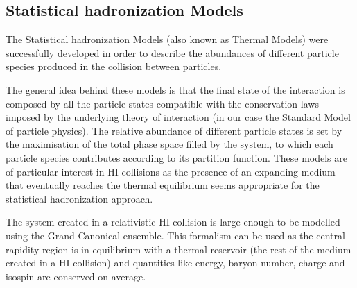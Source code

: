 
%
\subsection{Statistical hadronization Models} \label{sec:1.4.1}

The Statistical hadronization Models (also known as Thermal Models) were successfully developed
in order to describe the abundances of different particle species produced in the collision 
between particles.

The general idea behind these models is that the final state of the interaction is composed by
all the particle states compatible with the conservation laws imposed by the underlying theory 
of interaction (in our case the Standard Model of particle physics). 
The relative abundance of different particle states is set by the maximisation of the total phase
space filled by the system, to which each particle species contributes according to its partition 
function. These models are of particular interest in HI collisions as the presence of an expanding 
medium that eventually reaches the thermal equilibrium seems appropriate for the statistical
hadronization approach. 

The system created in a relativistic HI collision is large enough to be modelled using the 
Grand Canonical ensemble. 
This formalism can be used as the central rapidity region is in equilibrium with a thermal reservoir 
(the rest of the medium created in a HI collision) and quantities like energy, baryon number, 
charge and isospin are conserved on average.

